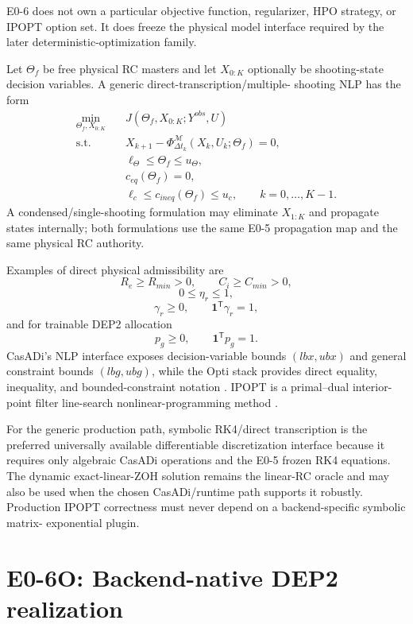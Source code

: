 \documentclass[11pt]{article}
\begin{document}
E0-6 does not own a particular objective function, regularizer, HPO strategy, or
IPOPT option set. It does freeze the physical model interface required by the
later deterministic-optimization family.

Let $\Theta_f$ be free physical RC masters and let $X_{0:K}$ optionally be
shooting-state decision variables. A generic direct-transcription/multiple-
shooting NLP has the form
\[
\boxed{
\begin{aligned}
\min_{\Theta_f,X_{0:K}}\quad & J(\Theta_f,X_{0:K};Y^{obs},U)\\
\text{s.t.}\quad
&X_{k+1}-\Phi_{\Delta t_k}^{\mathcal M}
 (X_k,U_k;\Theta_f)=0,\\
&\ell_\Theta\le\Theta_f\le u_\Theta,\\
&c_{eq}(\Theta_f)=0,\\
&\ell_c\le c_{ineq}(\Theta_f)\le u_c,
\qquad k=0,\ldots,K-1.
\end{aligned}}
\]
A condensed/single-shooting formulation may eliminate $X_{1:K}$ and propagate
states internally; both formulations use the same E0-5 propagation map and the
same physical RC authority.

Examples of direct physical admissibility are
\[
R_e\ge R_{min}>0,\qquad C_i\ge C_{min}>0,
\]
\[
0\le\eta_r\le1,
\]
\[
\gamma_r\ge0,\qquad \mathbf1^{\mathsf T}\gamma_r=1,
\]
and for trainable DEP2 allocation
\[
p_g\ge0,\qquad \mathbf1^{\mathsf T}p_g=1.
\]
CasADi's NLP interface exposes decision-variable bounds $(lbx,ubx)$ and general
constraint bounds $(lbg,ubg)$, while the Opti stack provides direct equality,
inequality, and bounded-constraint notation \cite{CasADiDocs2026}. IPOPT is a
primal--dual interior-point filter line-search nonlinear-programming method
\cite{WachterBiegler2006IPOPT}.

For the generic production path, symbolic RK4/direct transcription is the
preferred universally available differentiable discretization interface because
it requires only algebraic CasADi operations and the E0-5 frozen RK4 equations.
The dynamic exact-linear-ZOH solution remains the linear-RC oracle and may also
be used when the chosen CasADi/runtime path supports it robustly. Production
IPOPT correctness must never depend on a backend-specific symbolic matrix-
exponential plugin.

\section{E0-6O: Backend-native DEP2 realization}
\end{document}
